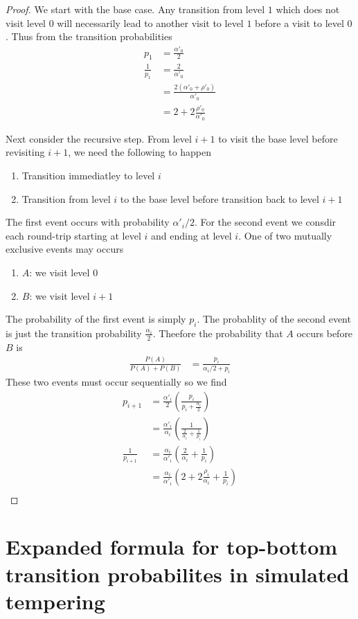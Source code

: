 \documentclass{article}
\begin{document}
\begin{proof}
We start with the base case. Any transition from level $1$ which does not visit
level $0$ will necessarily lead to another visit to level $1$ before a visit to
level $0$. Thus from the transition probabilities
\begin{align*}
p_1 &= \frac{\alpha'_0}{2} \\
\frac{1}{p_1} &= \frac{2}{\alpha'_0} \\
&= \frac{2(\alpha'_0+\rho'_0)}{\alpha'_0} \\
&= 2 + 2\frac{\rho'_0}{\alpha'_0}
\end{align*}

Next consider the recursive step. From level $i+1$ to visit the base level
before revisiting $i+1$, we need the following to happen 
\begin{enumerate}
    \item Transition immediatley to level $i$
    \item Transition from level $i$ to the base level before transition back to
    level $i+1$
\end{enumerate}
The first event occurs with probability $\alpha'_i/2$. For the second event we
consdir each round-trip starting at level $i$ and ending at level $i$. One
of two mutually exclusive events may occurs
\begin{enumerate}
    \item $A$: we visit level $0$
    \item $B$: we visit level $i+1$
\end{enumerate}
The probability of the first event is simply $p_i$. The probablity of the second
event is just the transition probability $\frac{\alpha_i}{2}$. Theefore the
probability that $A$ occurs before $B$ is 
\begin{align*}
\frac{P(A)}{P(A)+P(B)} &= \frac{p_i}{\alpha_{i}/2 + p_i}
\end{align*}
These two events must occur sequentially so we find 
\begin{align*}
p_{i+1} &= \frac{\alpha'_i}{2}\left(\frac{p_i}{p_i+\frac{\alpha_i}{2}}\right) \\
&= \frac{\alpha'_i}{\alpha_i}\left(\frac{1}{\frac{2}{\alpha_i}+\frac{1}{p_i}}\right) \\
\frac{1}{p_{i+1}}&= \frac{\alpha_i}{\alpha'_i}\left(\frac{2}{\alpha_i}+\frac{1}{p_i}\right) \\
&= \frac{\alpha_i}{\alpha'_i}\left(2+2\frac{\rho_i}{\alpha_i}+\frac{1}{p_i}\right) \\ 
\end{align*}
\end{proof}

\section{Expanded formula for top-bottom transition probabilites in simulated
tempering}
\end{document}
